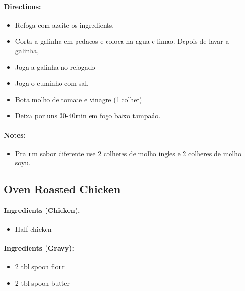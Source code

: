 \documentclass{article}
\begin{document}
\paragraph{Directions:}
\begin{itemize}
    \item Refoga com azeite os ingredients.
    \item Corta a galinha em pedacos e coloca na agua e limao. Depois de lavar a galinha,
    \item Joga a galinha no refogado
    \item Joga o cuminho com sal.
    \item Bota molho de tomate e vinagre (1 colher)
    \item Deixa por uns 30-40min em fogo baixo tampado.
\end{itemize}

\paragraph{Notes:}
\begin{itemize}
    \item Pra um sabor diferente use 2 colheres de molho ingles e 2 colheres de molho soyu.
\end{itemize}

\subsection{Oven Roasted Chicken} 

\paragraph{Ingredients (Chicken):}
\begin{itemize}
    \item Half chicken
\end{itemize}  

\paragraph{Ingredients (Gravy):}
\begin{itemize}
    \item 2 tbl spoon flour
    \item 2 tbl spoon butter
\end{itemize}  
\end{document}
